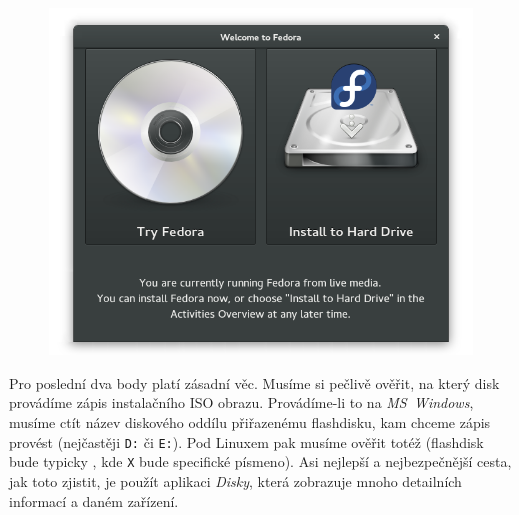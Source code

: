 \begin{figure}[t]
\begin{center}
\includegraphics[width=.75\textwidth]{img/instalator-a}
 \label{fig:instalator-a}
\end{center}
\end{figure}

Pro poslední dva body platí zásadní věc. Musíme si pečlivě ověřit, na který disk provádíme zápis instalačního ISO obrazu. Provádíme-li to na \emph{MS~Windows}, musíme ctít název diskového oddílu přiřazenému flashdisku, kam chceme zápis provést (nejčastěji \texttt{D:} či \texttt{E:}). Pod Linuxem pak musíme ověřit totéž (flashdisk bude typicky , kde \texttt{X} bude specifické písmeno). Asi nejlepší a nejbezpečnější cesta, jak toto zjistit, je použít aplikaci \emph{Disky}, která zobrazuje mnoho detailních informací a daném zařízení.

